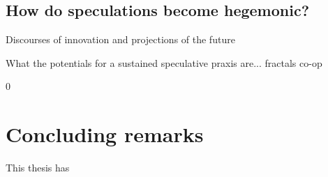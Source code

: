 \subsection{How do speculations become hegemonic?}


Discourses of innovation and projections of the future


What the potentials for a sustained speculative praxis are...
    fractals co-op

0


 \section{Concluding remarks}

 This thesis has

